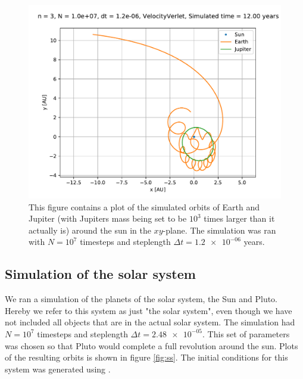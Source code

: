\documentclass[reprint,english,notitlepage]{revtex4-1}  %
\begin{document}
\begin{figure}[H]
\includegraphics[scale=0.5]{../data/figures/sun-earth-jupiter/sej_1000xM_vv_orbit2D.pdf}
\caption{This figure contains a plot of the simulated orbits of Earth and Jupiter (with Jupiters mass being set to be $10^3$ times larger than it actually is) around the sun in the $xy$-plane. The simulation was ran with $N=10^7$ timesteps and steplength $\Delta t = \num{1.2e-06}$ years.}
\label{fig:sej-1000}
\end{figure}



\subsection{Simulation of the solar system} \label{sec:IV:f}

We ran a simulation of the planets of the solar system, the Sun and Pluto. Hereby we refer to this system as just "the solar system", even though we have not included all objects that are in the actual solar system. The simulation had $N = 10^7$ timesteps and steplength $\Delta t = \num{2.48e-05}$. This set of parameters was chosen so that Pluto would complete a full revolution around the sun. Plots of the resulting orbits is shown in figure \ref{fig:ss}. The initial conditions for this system was generated using \citep{NASASolarInit}.
\end{document}
